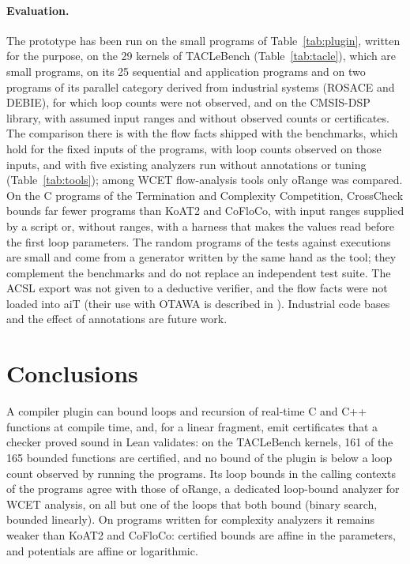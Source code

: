 \documentclass[oneside,english]{amsart}
\numberwithin{equation}{section}
\numberwithin{figure}{section}
\theoremstyle{plain}
\theoremstyle{definition}
\theoremstyle{plain}
\theoremstyle{remark}
\theoremstyle{plain}
\theoremstyle{definition}
\theoremstyle{plain}
\theoremstyle{remark}
\begin{document}
\paragraph{Evaluation.}
The prototype has been run on the small programs of Table~\ref{tab:plugin}, written for the purpose, on the 29 kernels of TACLeBench (Table~\ref{tab:tacle}), which are small programs, on its 25 sequential and application programs and on two programs of its parallel category derived from industrial systems (ROSACE and DEBIE), for which loop counts were not observed, and on the CMSIS-DSP library, with assumed input ranges and without observed counts or certificates. The comparison there is with the flow facts shipped with the benchmarks, which hold for the fixed inputs of the programs, with loop counts observed on those inputs, and with five existing analyzers run without annotations or tuning (Table~\ref{tab:tools}); among WCET flow-analysis tools only oRange was compared. On the C programs of the Termination and Complexity Competition, CrossCheck bounds far fewer programs than KoAT2 and CoFloCo, with input ranges supplied by a script or, without ranges, with a harness that makes the values read before the first loop parameters. The random programs of the tests against executions are small and come from a generator written by the same hand as the tool; they complement the benchmarks and do not replace an independent test suite. The ACSL export was not given to a deductive verifier, and the flow facts were not loaded into aiT (their use with OTAWA is described in \cite{crosscheckBinary}). Industrial code bases and the effect of annotations are future work.


\section*{Conclusions}

A compiler plugin can bound loops and recursion of real-time C and C++ functions at compile time, and, for a linear fragment, emit certificates that a checker proved sound in Lean validates: on the TACLeBench kernels, 161 of the 165 bounded functions are certified, and no bound of the plugin is below a loop count observed by running the programs. Its loop bounds in the calling contexts of the programs agree with those of oRange, a dedicated loop-bound analyzer for WCET analysis, on all but one of the loops that both bound (binary search, bounded linearly). On programs written for complexity analyzers it remains weaker than KoAT2 and CoFloCo: certified bounds are affine in the parameters, and potentials are affine or logarithmic.
\end{document}
